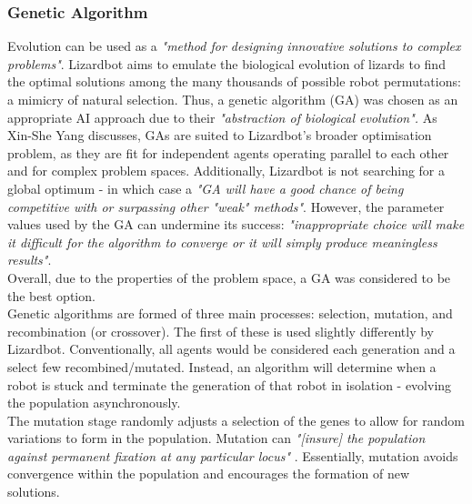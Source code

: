 \documentclass{article}
\begin{document}
\subsubsection{Genetic Algorithm}
\label{sec:Genetic Algorithm Aims}
Evolution can be used as a \textit{"method for designing innovative solutions to complex problems"}.  Lizardbot aims to emulate the biological evolution of lizards to find the optimal solutions among the many thousands of possible robot permutations: a mimicry of natural selection.
Thus, a genetic algorithm (GA) was chosen as an appropriate AI approach due to their \textit{"abstraction of biological evolution".} As Xin-She Yang discusses, GAs are suited to Lizardbot's broader optimisation problem, as they are fit for independent agents operating parallel to each other and for complex problem spaces.  Additionally, Lizardbot is not searching for a global optimum - in which case a \textit{"GA will have a good chance of being competitive with or surpassing other "weak" methods"}.  However, the parameter values used by the GA can undermine its success: \textit{"inappropriate choice will make it difficult for the algorithm to converge or it will simply produce meaningless results"}.
 \\
Overall, due to the properties of the problem space, a GA was considered to be the best option.\\

Genetic algorithms are formed of three main processes: selection, mutation, and recombination (or crossover).  The first of these is used slightly differently by Lizardbot. Conventionally, all agents would be considered each generation and a select few recombined/mutated. Instead, an algorithm will determine when a robot is stuck and terminate the generation of that robot in isolation - evolving the population asynchronously. \\

The mutation stage randomly adjusts a selection of the genes to allow for random variations to form in the population. Mutation can \textit{"[insure]
the population against permanent fixation at any particular locus"} . Essentially, mutation avoids convergence within the population and encourages the formation of new solutions. 
\end{document}
